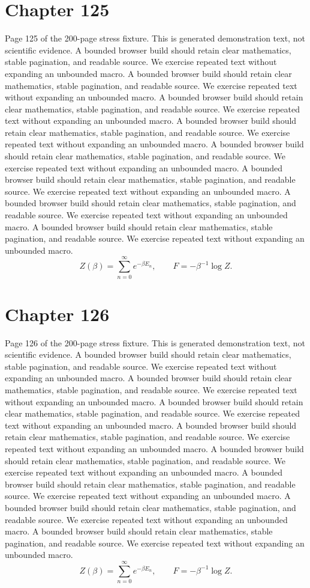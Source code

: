 \documentclass[11pt]{article}
\begin{document}
\section*{Chapter 125}
Page 125 of the 200-page stress fixture. This is generated demonstration text, not scientific evidence.
A bounded browser build should retain clear mathematics, stable pagination, and readable source. We exercise repeated text without expanding an unbounded macro.
A bounded browser build should retain clear mathematics, stable pagination, and readable source. We exercise repeated text without expanding an unbounded macro.
A bounded browser build should retain clear mathematics, stable pagination, and readable source. We exercise repeated text without expanding an unbounded macro.
A bounded browser build should retain clear mathematics, stable pagination, and readable source. We exercise repeated text without expanding an unbounded macro.
A bounded browser build should retain clear mathematics, stable pagination, and readable source. We exercise repeated text without expanding an unbounded macro.
A bounded browser build should retain clear mathematics, stable pagination, and readable source. We exercise repeated text without expanding an unbounded macro.
A bounded browser build should retain clear mathematics, stable pagination, and readable source. We exercise repeated text without expanding an unbounded macro.
A bounded browser build should retain clear mathematics, stable pagination, and readable source. We exercise repeated text without expanding an unbounded macro.
\[Z(\beta)=\sum_{n=0}^{\infty}e^{-\beta E_n},\qquad F=-\beta^{-1}\log Z.\]
\newpage
\section*{Chapter 126}
Page 126 of the 200-page stress fixture. This is generated demonstration text, not scientific evidence.
A bounded browser build should retain clear mathematics, stable pagination, and readable source. We exercise repeated text without expanding an unbounded macro.
A bounded browser build should retain clear mathematics, stable pagination, and readable source. We exercise repeated text without expanding an unbounded macro.
A bounded browser build should retain clear mathematics, stable pagination, and readable source. We exercise repeated text without expanding an unbounded macro.
A bounded browser build should retain clear mathematics, stable pagination, and readable source. We exercise repeated text without expanding an unbounded macro.
A bounded browser build should retain clear mathematics, stable pagination, and readable source. We exercise repeated text without expanding an unbounded macro.
A bounded browser build should retain clear mathematics, stable pagination, and readable source. We exercise repeated text without expanding an unbounded macro.
A bounded browser build should retain clear mathematics, stable pagination, and readable source. We exercise repeated text without expanding an unbounded macro.
A bounded browser build should retain clear mathematics, stable pagination, and readable source. We exercise repeated text without expanding an unbounded macro.
\[Z(\beta)=\sum_{n=0}^{\infty}e^{-\beta E_n},\qquad F=-\beta^{-1}\log Z.\]
\newpage
\end{document}
